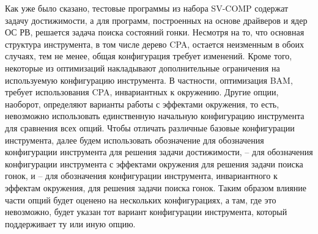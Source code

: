 Как уже было сказано, тестовые программы из набора SV-COMP содержат задачу достижимости, а для программ, построенных на основе драйверов и ядер ОС РВ, решается задача поиска состояний гонки.
Несмотря на то, что основная структура инструмента, в том числе дерево CPA, остается неизменным в обоих случаях, тем не менее, общая конфигурация требует изменений.
Кроме того, некоторые из оптимизаций накладывают дополнительные ограничения на используемую конфигурацию инструмента.
В частности, оптимизация BAM, требует использования CPA, инвариантных к окружению.
Другие опции, наоборот, определяют варианты работы с эффектами окружения, то есть, невозможно использовать единственную начальную конфигурацию инструмента для сравнения всех опций.
Чтобы отличать различные базовые конфигурации инструмента, далее будем использовать обозначение \textit{\theory} для обозначения конфигурации инструмента для решения задачи достижимости, \textit{\theoryraces} -- для обозначения конфигурации инструмента с эффектами окружения для решения задачи поиска гонок, и \textit{\combatmode} -- для обозначения конфигурации инструмента, инвариантного к эффектам окружения, для решения задачи поиска гонок.
Таким образом влияние части опций будет оценено на нескольких конфигурациях, а там, где это невозможно, будет указан тот вариант конфигурации инструмента, который поддерживает ту или иную опцию.

